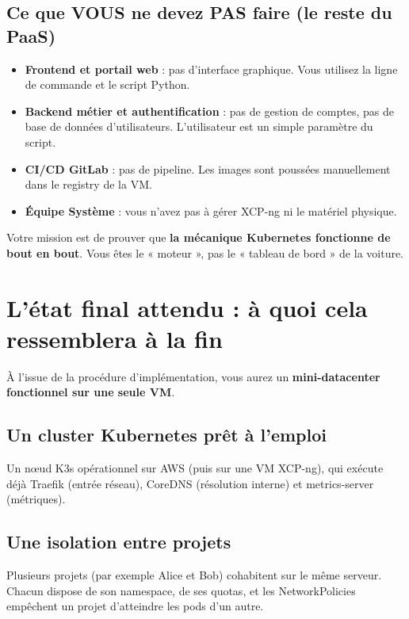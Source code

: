 \documentclass[12pt,a4paper]{article}
\begin{document}
\subsection{Ce que VOUS ne devez PAS faire (le reste du PaaS)}
\begin{itemize}
    \item \textbf{Frontend et portail web} : pas d'interface graphique. Vous utilisez la ligne de commande et le script Python.
    \item \textbf{Backend métier et authentification} : pas de gestion de comptes, pas de base de données d'utilisateurs. L'utilisateur est un simple paramètre du script.
    \item \textbf{CI/CD GitLab} : pas de pipeline. Les images sont poussées manuellement dans le registry de la VM.
    \item \textbf{Équipe Système} : vous n'avez pas à gérer XCP-ng ni le matériel physique.
\end{itemize}

\begin{tcolorbox}[colback=red!5!white,colframe=red!75!black,title=En résumé]
Votre mission est de prouver que \textbf{la mécanique Kubernetes fonctionne de bout en bout}. Vous êtes le « moteur », pas le « tableau de bord » de la voiture.
\end{tcolorbox}

\section{L'état final attendu : à quoi cela ressemblera à la fin}

À l'issue de la procédure d'implémentation, vous aurez un \textbf{mini-datacenter fonctionnel sur une seule VM}.

\subsection{Un cluster Kubernetes prêt à l'emploi}
Un nœud K3s opérationnel sur AWS (puis sur une VM XCP-ng), qui exécute déjà Traefik (entrée réseau), CoreDNS (résolution interne) et metrics-server (métriques).

\subsection{Une isolation entre projets}
Plusieurs projets (par exemple Alice et Bob) cohabitent sur le même serveur. Chacun dispose de son namespace, de ses quotas, et les NetworkPolicies empêchent un projet d'atteindre les pods d'un autre.
\end{document}
